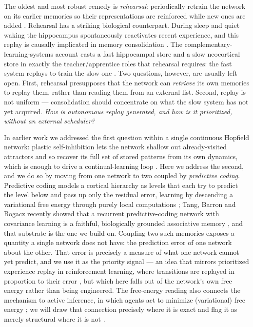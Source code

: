 \documentclass[10pt,letterpaper]{article}
\theoremstyle{plain}
\theoremstyle{remark}
\begin{document}
The oldest and most robust remedy is \emph{rehearsal}: periodically retrain the network on its earlier
memories so their representations are reinforced while new ones are added
\cite{robins1995catastrophic}. Rehearsal has a striking biological counterpart. During sleep and quiet
waking the hippocampus spontaneously reactivates recent experience, and this replay is causally
implicated in memory consolidation \cite{wilson1994reactivation,diekelmann2010memory}. The
complementary-learning-systems account casts a fast hippocampal store and a slow neocortical store in
exactly the teacher/apprentice roles that rehearsal requires: the fast system replays to train the slow
one \cite{mcclelland1995cls,kumaran2016what}. Two questions, however, are usually left open. First,
rehearsal presupposes that the network can \emph{retrieve} its own memories to replay them, rather than
reading them from an external list. Second, replay is not uniform --- consolidation should concentrate
on what the slow system has not yet acquired. \emph{How is autonomous replay generated, and how is it
prioritized, without an external scheduler?}

In earlier work we addressed the first question within a single continuous Hopfield network: plastic
self-inhibition lets the network shallow out already-visited attractors and so recover its full set of
stored patterns from its own dynamics, which is enough to drive a continual-learning loop
\cite{saighi2025autonomous}. Here we address the second, and we do so by moving from one network to two
coupled by \emph{predictive coding}. Predictive coding models a cortical hierarchy as levels that each
try to predict the level below and pass up only the residual error, learning by descending a
variational free energy through purely local computations
\cite{raoballard1999,whittington2017,millidge2022review}; Tang, Barron and Bogacz recently showed that a
recurrent predictive-coding network with covariance learning is a faithful, biologically grounded
associative memory \cite{tang2023covpcn}, and that substrate is the one we build on. Coupling two such
memories exposes a quantity a single network does not have: the prediction error of one network about
the other. That error is precisely a measure of what one network cannot yet predict, and we use it as
the priority signal --- an idea that mirrors prioritized experience replay in reinforcement learning,
where transitions are replayed in proportion to their error \cite{schaul2016prioritized}, but which here
falls out of the network's own free energy rather than being engineered. The free-energy reading also
connects the mechanism to active inference, in which agents act to minimize (variational) free energy
\cite{friston2010free,friston2017process}; we will draw that connection precisely where it is exact and
flag it as merely structural where it is not \cite{millidge2021whence}.
\end{document}
